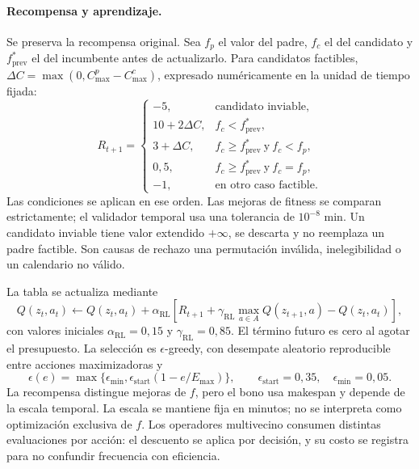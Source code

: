\documentclass[11pt,a4paper]{article}
\newcommand{\Cmax}{C_{\max}}
\newcommand{\Emax}{E_{\max}}
\begin{document}
\paragraph{Recompensa y aprendizaje.}
Se preserva la recompensa original. Sea $f_p$ el valor del padre, $f_c$ el del candidato y $f^*_{\mathrm{prev}}$ el del incumbente antes de actualizarlo. Para candidatos factibles, $\Delta C=\max(0,\Cmax^p-\Cmax^c)$, expresado numéricamente en la unidad de tiempo fijada:
\begin{equation}
R_{t+1}=\begin{cases}
-5,&\text{candidato inviable},\\
10+2\Delta C,& f_c<f^*_{\mathrm{prev}},\\
3+\Delta C,& f_c\geq f^*_{\mathrm{prev}}\ \text{y}\ f_c<f_p,\\
0{,}5,& f_c\geq f^*_{\mathrm{prev}}\ \text{y}\ f_c=f_p,\\
-1,&\text{en otro caso factible}.
\end{cases}
\label{eq:reward}
\end{equation}
Las condiciones se aplican en ese orden. Las mejoras de fitness se comparan estrictamente; el validador temporal usa una tolerancia de $10^{-8}$ min. Un candidato inviable tiene valor extendido $+\infty$, se descarta y no reemplaza un padre factible. Son causas de rechazo una permutación inválida, inelegibilidad o un calendario no válido.

La tabla se actualiza mediante
\begin{equation}
Q(z_t,a_t)\leftarrow Q(z_t,a_t)+\alpha_{\mathrm{RL}}
\left[R_{t+1}+\gamma_{\mathrm{RL}}\max_{a\in A}Q(z_{t+1},a)-Q(z_t,a_t)\right],
\label{eq:q}
\end{equation}
con valores iniciales $\alpha_{\mathrm{RL}}=0{,}15$ y $\gamma_{\mathrm{RL}}=0{,}85$. El término futuro es cero al agotar el presupuesto. La selección es $\epsilon$-greedy, con desempate aleatorio reproducible entre acciones maximizadoras y
\begin{equation}
\epsilon(e)=\max\{\epsilon_{\min},\epsilon_{\mathrm{start}}(1-e/\Emax)\},\qquad
\epsilon_{\mathrm{start}}=0{,}35,\quad\epsilon_{\min}=0{,}05.
\end{equation}
La recompensa distingue mejoras de $f$, pero el bono usa makespan y depende de la escala temporal. La escala se mantiene fija en minutos; no se interpreta como optimización exclusiva de $f$. Los operadores multivecino consumen distintas evaluaciones por acción: el descuento se aplica por decisión, y su costo se registra para no confundir frecuencia con eficiencia.
\end{document}
